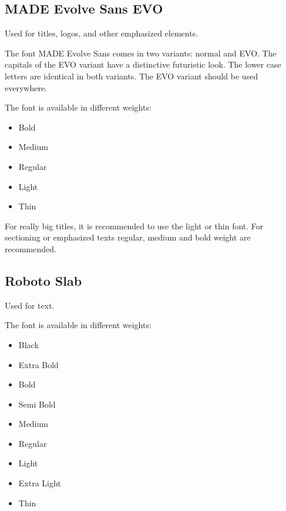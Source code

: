 \documentclass[letterpaper,10pt,english]{sphinxmanual}
\begin{document}
\subsection{MADE Evolve Sans EVO}
\label{\detokenize{design/fonts:made-evolve-sans-evo}}
Used for titles, logos, and other emphasized elements.

The font MADE Evolve Sans comes in two variants: normal and EVO.
The capitals of the EVO variant have a distinctive futuristic look.
The lower case letters are identical in both variants.
The EVO variant should be used everywhere.

The font is available in different weights:
\begin{itemize}
\item {} 
Bold

\item {} 
Medium

\item {} 
Regular

\item {} 
Light

\item {} 
Thin

\end{itemize}

For really big titles, it is recommended to use the light or thin font.
For sectioning or emphasized texts regular, medium and bold weight are recommended.

\begin{figure}[htbp]
\centering

\noindent{}
\end{figure}


\subsection{Roboto Slab}
\label{\detokenize{design/fonts:roboto-slab}}
Used for text.

The font is available in different weights:
\begin{itemize}
\item {} 
Black

\item {} 
Extra Bold

\item {} 
Bold

\item {} 
Semi Bold

\item {} 
Medium

\item {} 
Regular

\item {} 
Light

\item {} 
Extra Light

\item {} 
Thin

\end{itemize}
\end{document}
